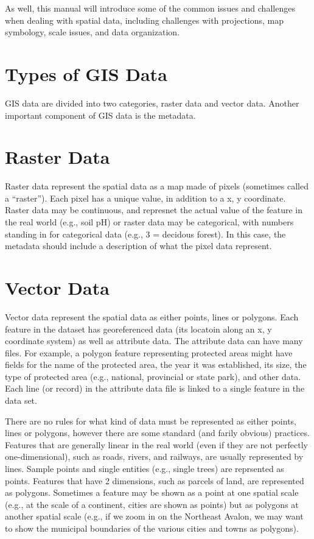 \documentclass[
]{book}
\begin{document}
As well, this manual will introduce some of the common issues and challenges when dealing with spatial data, including challenges with projections, map symbology, scale issues, and data organization.

\hypertarget{types-of-gis-data}{%
\section{Types of GIS Data}\label{types-of-gis-data}}

GIS data are divided into two categories, raster data and vector data. Another important component of GIS data is the metadata.

\hypertarget{raster-data}{%
\section{Raster Data}\label{raster-data}}

Raster data represent the spatial data as a map made of pixels (sometimes called a ``raster''). Each pixel has a unique value, in addition to a x, y coordinate. Raster data may be continuous, and represnet the actual value of the feature in the real world (e.g., soil pH) or raster data may be categorical, with numbers standing in for categorical data (e.g., 3 = decidous forest). In this case, the metadata should include a description of what the pixel data represent.

\hypertarget{vector-data}{%
\section{Vector Data}\label{vector-data}}

Vector data represent the spatial data as either points, lines or polygons. Each feature in the dataset has georeferenced data (its locatoin along an x, y coordinate system) as well as attribute data. The attribute data can have many files. For example, a polygon feature representing protected areas might have fields for the name of the protected area, the year it was established, its size, the type of protected area (e.g., national, provincial or state park), and other data. Each line (or record) in the attribute data file is linked to a single feature in the data set.

There are no rules for what kind of data must be represented as either points, lines or polygons, however there are some standard (and farily obvious) practices. Features that are generally linear in the real world (even if they are not perfectly one-dimensional), such as roads, rivers, and railways, are usually represented by lines. Sample points and single entities (e.g., single trees) are reprsented as points. Features that have 2 dimensions, such as parcels of land, are represented as polygons. Sometimes a feature may be shown as a point at one spatial scale (e.g., at the scale of a continent, cities are shown as points) but as polygons at another spatial scale (e.g., if we zoom in on the Northeast Avalon, we may want to show the municipal boundaries of the various cities and towns as polygons).
\end{document}
